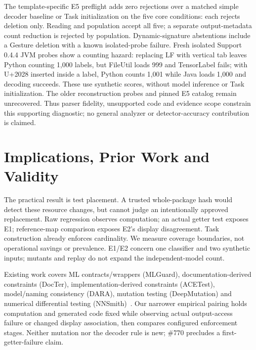 \documentclass[10pt,conference]{IEEEtran}
\begin{document}
The template-specific E5 preflight adds zero rejections over a matched simple decoder baseline or Task initialization on the five core conditions: each rejects deletion only. Reading and population accept all five; a separate output-metadata count reduction is rejected by population. Dynamic-signature abstentions include a Gesture deletion with a known isolated-probe failure. Fresh isolated Support 0.4.4 JVM probes show a counting hazard: replacing LF with vertical tab leaves Python counting 1,000 labels, but FileUtil loads 999 and TensorLabel fails; with U+2028 inserted inside a label, Python counts 1,001 while Java loads 1,000 and decoding succeeds. These use synthetic scores, without model inference or Task initialization. The older reconstruction probes and pinned E5 catalog remain unrecovered. Thus parser fidelity, unsupported code and evidence scope constrain this supporting diagnostic; no general analyzer or detector-accuracy contribution is claimed.

\section{Implications, Prior Work and Validity}
\label{sec:discussion}
The practical result is test placement. A trusted whole-package hash would detect these resource changes, but cannot judge an intentionally approved replacement. Raw regression observes computation; an actual getter test exposes E1; reference-map comparison exposes E2's display disagreement. Task construction already enforces cardinality. We measure coverage boundaries, not operational savings or prevalence. E1/E2 concern one classifier and two synthetic inputs; mutants and replay do not expand the independent-model count.

\label{sec:related}
Existing work covers ML contracts/wrappers (MLGuard), documentation-derived constraints (DocTer), implementation-derived constraints (ACETest), model/naming consistency (DARA), mutation testing (DeepMutation) and numerical differential testing (NNSmith)~\cite{mlguard,docter,acetest,dara,deepmutation,nnsmith}. Our narrower empirical pairing holds computation and generated code fixed while observing actual output-access failure or changed display association, then compares configured enforcement stages. Neither mutation nor the decoder rule is new; \#770 precludes a first-getter-failure claim.

\label{sec:validity}
\end{document}
